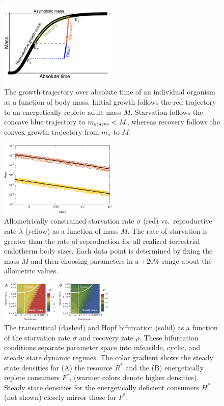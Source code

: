 \documentclass{pnastwo}
\begin{document}
\begin{figure}
\centering
\includegraphics[width=0.5\textwidth]{Growth-trajectory-diagram.pdf}
\caption{ The growth trajectory over absolute time of an individual organism
  as a function of body mass.  Initial growth follows the red trajectory to
  an energetically replete adult mass $M$.  Starvation follows the concave
  blue trajectory to $m_{\rm starve} < M$, whereas recovery follows the
  convex growth trajectory from $m_\sigma$ to $M$.  }
\label{fig:growth}
\end{figure}

\begin{figure}
\centering
\includegraphics[width=0.5\textwidth]{fig_GvS.pdf}
\caption{ Allometrically constrained starvation rate $\sigma$ (red) vs.\
  reproductive rate $\lambda$ (yellow) as a function of mass $M$.  The rate
  of starvation is greater than the rate of reproduction for all realized
  terrestrial endotherm body sizes.  Each data point is determined by fixing
  the mass $M$ and then choosing parameters in a $\pm 20$\% range about the
  allometric values.}
\label{fig:gvs}
\end{figure}

\begin{figure}
\centering
\includegraphics[width=0.5\textwidth]{fig_FixedPoint.pdf}
\caption{ The transcritical (dashed) and Hopf bifurcation (solid) as a
  function of the starvation rate $\sigma$ and recovery rate $\rho$.  These
  bifurcation conditions separate parameter space into infeasible, cyclic,
  and steady state dynamic regimes.  The color gradient shows the steady
  state densities for (A) the resource $R^*$ and the (B) energetically
  replete consumers $F^*$, (warmer colors denote higher densities).  Steady
  state densities for the energetically deficient consumers $H^*$ (not shown)
  closely mirror those for $F^*$.  }
\label{fig:fp}
\end{figure}
\end{document}
